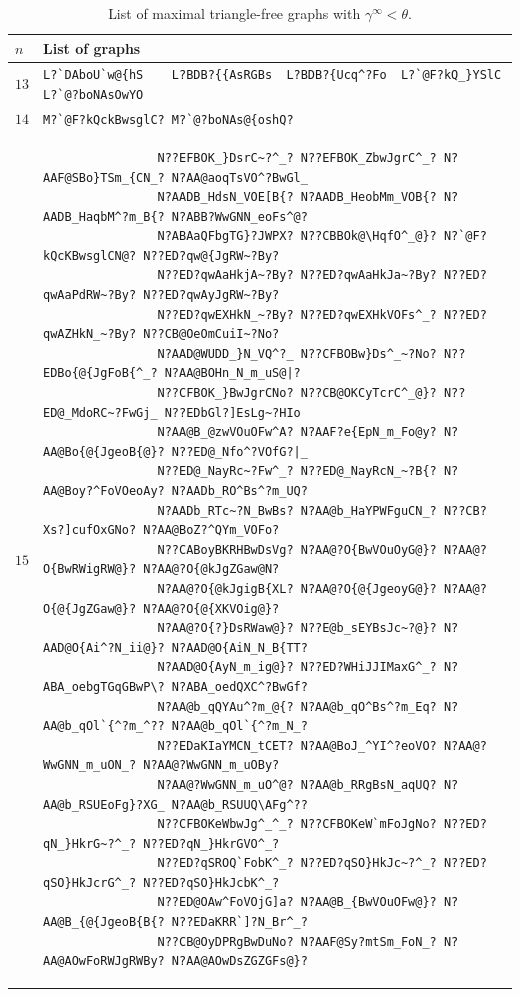 \documentclass[11pt]{article}
\begin{document}
	\newpage
	\begin{table}[h!]
		\small
		\begin{center}
			\caption{List of maximal triangle-free graphs with $\gamma^\infty<\theta$.}
			\label{Appendix:MaximalTriangleFree}
			\begin{tabular}{|p{0.5cm} | p{14.5cm}|}
				\hline
				$n$ & List of graphs \\
				\hline
				\hline
				$13$ & 
				\verb|L?`DAboU`w@{hS	L?BDB?{{AsRGBs	L?BDB?{Ucq^?Fo	L?`@F?kQ_}YSlC	L?`@?boNAsOwYO| \\
				\hline
				$14$ & 
				\verb|M?`@F?kQckBwsglC? M?`@?boNAs@{oshQ?| \\
				\hline
				$15$ & 
				\vspace{-18pt}
				\begin{verbatim}
				N??EFBOK_}DsrC~?^_? N??EFBOK_ZbwJgrC^_? N?AAF@SBo}TSm_{CN_? N?AA@aoqTsVO^?BwGl_
				N?AADB_HdsN_VOE[B{? N?AADB_HeobMm_VOB{? N?AADB_HaqbM^?m_B{? N?ABB?WwGNN_eoFs^@?
				N?ABAaQFbgTG}?JWPX? N??CBBOk@\HqfO^_@}? N?`@F?kQcKBwsglCN@? N??ED?qw@{JgRW~?By?
				N??ED?qwAaHkjA~?By? N??ED?qwAaHkJa~?By? N??ED?qwAaPdRW~?By? N??ED?qwAyJgRW~?By?
				N??ED?qwEXHkN_~?By? N??ED?qwEXHkVOFs^_? N??ED?qwAZHkN_~?By? N??CB@OeOmCuiI~?No?
				N?AAD@WUDD_}N_VQ^?_ N??CFBOBw}Ds^_~?No? N??EDBo{@{JgFoB{^_? N?AA@BOHn_N_m_uS@|?
				N??CFBOK_}BwJgrCNo? N??CB@OKCyTcrC^_@}? N??ED@_MdoRC~?FwGj_ N??EDbGl?]EsLg~?HIo
				N?AA@B_@zwVOuOFw^A? N?AAF?e{EpN_m_Fo@y? N?AA@Bo{@{JgeoB{@}? N??ED@_Nfo^?VOfG?|_
				N??ED@_NayRc~?Fw^_? N??ED@_NayRcN_~?B{? N?AA@Boy?^FoVOeoAy? N?AADb_RO^Bs^?m_UQ?
				N?AADb_RTc~?N_BwBs? N?AA@b_HaYPWFguCN_? N??CB?Xs?]cufOxGNo? N?AA@BoZ?^QYm_VOFo?
				N??CABoyBKRHBwDsVg? N?AA@?O{BwVOuOyG@}? N?AA@?O{BwRWigRW@}? N?AA@?O{@kJgZGaw@N?
				N?AA@?O{@kJgigB{XL? N?AA@?O{@{JgeoyG@}? N?AA@?O{@{JgZGaw@}? N?AA@?O{@{XKVOig@}?
				N?AA@?O{?}DsRWaw@}? N??E@b_sEYBsJc~?@}? N?AAD@O{Ai^?N_ii@}? N?AAD@O{AiN_N_B{TT?
				N?AAD@O{AyN_m_ig@}? N??ED?WHiJJIMaxG^_? N?ABA_oebgTGqGBwP\? N?ABA_oedQXC^?BwGf?
				N?AA@b_qQYAu^?m_@{? N?AA@b_qO^Bs^?m_Eq? N?AA@b_qOl`{^?m_^?? N?AA@b_qOl`{^?m_N_?
				N??EDaKIaYMCN_tCET? N?AA@BoJ_^YI^?eoVO? N?AA@?WwGNN_m_uON_? N?AA@?WwGNN_m_uOBy?
				N?AA@?WwGNN_m_uO^@? N?AA@b_RRgBsN_aqUQ? N?AA@b_RSUEoFg}?XG_ N?AA@b_RSUUQ\AFg^?? 
				N??CFBOKeWbwJg^_^_? N??CFBOKeW`mFoJgNo? N??ED?qN_}HkrG~?^_? N??ED?qN_}HkrGVO^_?
				N??ED?qSROQ`FobK^_? N??ED?qSO}HkJc~?^_? N??ED?qSO}HkJcrG^_? N??ED?qSO}HkJcbK^_?
				N??ED@OAw^FoVOjG]a? N?AA@B_{BwVOuOFw@}? N?AA@B_{@{JgeoB{B{? N??EDaKRR`]?N_Br^_?
				N??CB@OyDPRgBwDuNo? N?AAF@Sy?mtSm_FoN_? N?AA@AOwFoRWJgRWBy? N?AA@AOwDsZGZGFs@}?

\end{verbatim}
\end{tabular}
\end{center}
\end{table}
\end{document}
